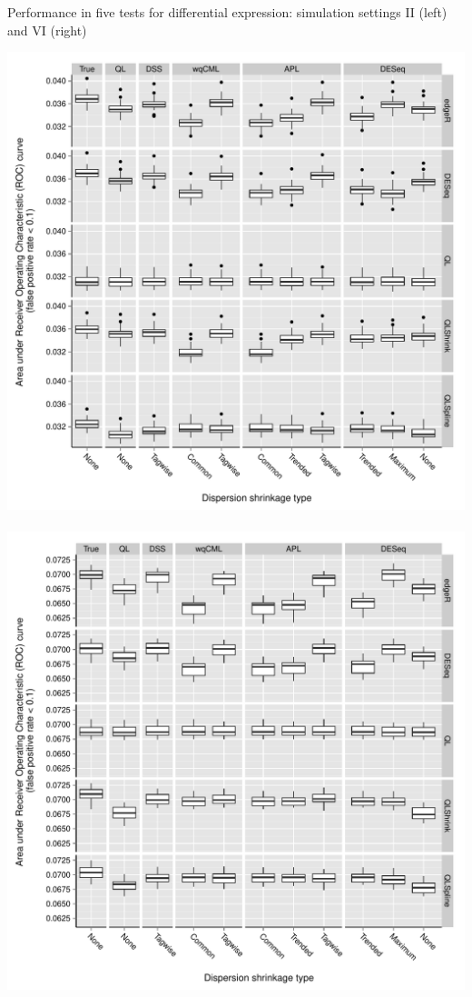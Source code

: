 \documentclass{beamer}
\begin{document}
\begin{frame}
\begin{columns}[t]
\begin{column}{.33\linewidth}
\begin{block}{Performance in five tests for differential expression: simulation settings II (left) and VI (right)}
\begin{center}
\includegraphics{../fig/auc2_slides.pdf} $\quad$ \includegraphics{../fig/auc6_slides.pdf}  
\end{center}
\end{block}





\end{column}
\end{columns}
\end{frame}
\end{document}
